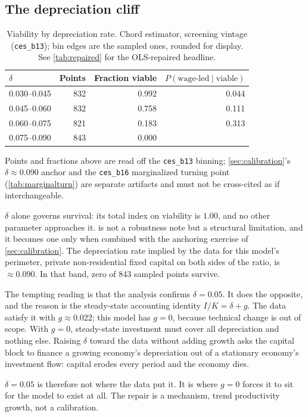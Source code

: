 \subsection{The depreciation cliff}
\label{sec:delta}

\begin{table}[htbp]
\centering
\small
\caption{Viability by depreciation rate. Chord estimator, screening vintage
(\texttt{ces\_b13}); bin edges are the sampled ones, rounded for display. See
\cref{tab:repaired} for the OLS-repaired headline.}
\label{tab:delta}
\begin{tabular}{lrrr}
\toprule
$\delta$ & Points & Fraction viable & $P(\text{wage-led} \mid \text{viable})$\\
\midrule
0.030--0.045 & 832 & 0.992 & 0.044\\
0.045--0.060 & 832 & 0.758 & 0.111\\
0.060--0.075 & 821 & 0.183 & 0.313\\
0.075--0.090 & 843 & 0.000 & \\
\bottomrule
\end{tabular}
\end{table}

Points and fractions above are read off the \texttt{ces\_b13} binning;
\cref{sec:calibration}'s $\delta \approx 0.090$ anchor and the \texttt{ces\_b16}
marginalized turning point (\cref{tab:marginalturn}) are separate artifacts and
must not be cross-cited as if interchangeable.

$\delta$ alone governs survival: its total index on viability is $1.00$, and no
other parameter approaches it.  is not a robustness note but a
structural limitation, and it becomes one only when combined with the anchoring
exercise of \cref{sec:calibration}. The depreciation rate implied by the
data for this model's perimeter, private non-residential fixed capital on
both sides of the ratio, is $\approx 0.090$. In that band, zero of
843 sampled points survive.

\begin{remark}
The tempting reading is that the analysis confirms $\delta = 0.05$. It
does the opposite, and the reason is the steady-state accounting identity
$I/K = \delta + g$. The data satisfy it with $g \approx 0.022$; this model has
$g = 0$, because technical change is out of scope. With $g = 0$, steady-state
investment must cover all depreciation and nothing else. Raising
$\delta$ toward the data without adding growth asks the capital block to
finance a growing economy's depreciation out of a stationary economy's
investment flow: capital erodes every period and the economy dies.

$\delta = 0.05$ is therefore not where the data put it. It is where
$g = 0$ forces it to sit for the model to exist at all. The repair is a
mechanism, trend productivity growth, not a calibration.
\end{remark}

